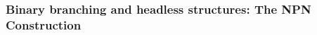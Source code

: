 \documentclass[output=paper,biblatex,babelshorthands,newtxmath,draftmode,colorlinks,citecolor=brown]{langscibook}
\begin{document}

\subsubsection{Binary branching and headless structures: The NPN Construction}
\label{sec-npn-minimalism}
\end{document}

